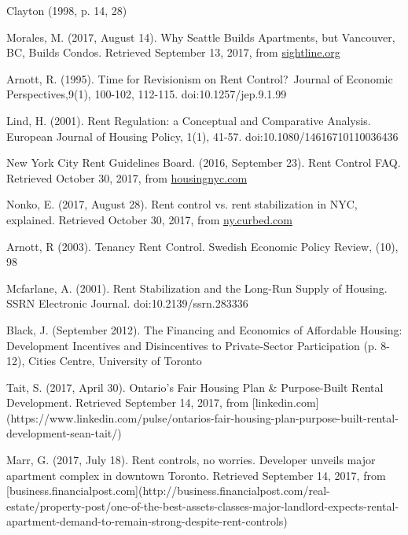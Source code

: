 \begin{thebibliography}{9}
 Clayton (1998, p. 14, 28) 

  Morales, M. (2017, August 14). Why Seattle Builds Apartments, but Vancouver, BC, Builds Condos. Retrieved September 13, 2017, from \href{http://www.sightline.org/2017/08/14/why-seattle-builds-apartments-but-vancouver-bc-builds-condos/}{sightline.org}


   Arnott, R. (1995). Time for Revisionism on Rent Control? Journal of Economic Perspectives,9(1), 100-102, 112-115. doi:10.1257/jep.9.1.99

  Lind, H. (2001). Rent Regulation: a Conceptual and Comparative Analysis. European Journal of Housing Policy, 1(1), 41-57. doi:10.1080/14616710110036436

  New York City Rent Guidelines Board. (2016, September 23). Rent Control FAQ. Retrieved October 30, 2017, from \href{http://www.housingnyc.com/html/resources/faq/rentcontrol.html}{housingnyc.com}

  Nonko, E. (2017, August 28). Rent control vs. rent stabilization in NYC, explained. Retrieved October 30, 2017, from \href{https://ny.curbed.com/2017/8/28/16214506/nyc-apartments-housing-rent-control}{ny.curbed.com}

  Arnott, R (2003). Tenancy Rent Control. Swedish Economic Policy Review, (10), 98

  Mcfarlane, A. (2001). Rent Stabilization and the Long-Run Supply of Housing. SSRN Electronic Journal. doi:10.2139/ssrn.283336

  Black, J. (September 2012). The Financing and Economics of Affordable Housing: Development Incentives and Disincentives to Private-Sector Participation (p. 8-12), Cities Centre, University of Toronto

  Tait, S. (2017, April 30). Ontario’s Fair Housing Plan \& Purpose-Built Rental Development. Retrieved September 14, 2017, from [linkedin.com](https://www.linkedin.com/pulse/ontarios-fair-housing-plan-purpose-built-rental-development-sean-tait/)

  Marr, G. (2017, July 18). Rent controls, no worries. Developer unveils major apartment complex in downtown Toronto. Retrieved September 14, 2017, from [business.financialpost.com](http://business.financialpost.com/real-estate/property-post/one-of-the-best-assets-classes-major-landlord-expects-rental-apartment-demand-to-remain-strong-despite-rent-controls)


\end{thebibliography}
